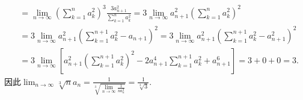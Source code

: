 \documentclass[lang=cn,newtx,10pt,scheme=chinese]{elegantbook}
\begin{document}
\begin{solution}
\begin{align*}
&=\lim_{n\rightarrow\infty}\left(\sum\limits_{k = 1}^n{a_{k}^{2}}\right)^3\frac{3a_{n + 1}^{2}}{\sum\limits_{k = 1}^n{a_{k}^{2}}}=3\lim_{n\rightarrow\infty}a_{n + 1}^{2}\left(\sum\limits_{k = 1}^n{a_{k}^{2}}\right)^2\\
&=3\lim_{n\rightarrow\infty}a_{n + 1}^{2}\left(\sum\limits_{k = 1}^{n + 1}{a_{k}^{2}}-a_{n + 1}\right)^2=3\lim_{n\rightarrow\infty}a_{n + 1}^{2}\left(\sum\limits_{k = 1}^{n + 1}{a_{k}^{2}}-a_{n + 1}^{2}\right)^2\\
&=3\lim_{n\rightarrow\infty}\left[a_{n + 1}^{2}\left(\sum\limits_{k = 1}^{n + 1}{a_{k}^{2}}\right)^2 - 2a_{n + 1}^{4}\sum\limits_{k = 1}^{n + 1}{a_{k}^{2}}+a_{n + 1}^{6}\right]=3 + 0 + 0 = 3.
\end{align*}
因此\(\lim_{n\rightarrow\infty}\sqrt[3]{n}a_n=\frac{1}{\sqrt[3]{\lim\limits_{n\rightarrow\infty}\frac{1}{na_{n}^{3}}}}=\frac{1}{\sqrt[3]{3}}\).
\end{solution}
\end{document}
